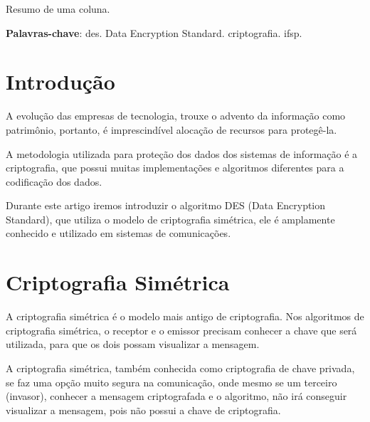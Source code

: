 \documentclass[
	article,			%
	12pt,				%
	oneside,			%
	a4paper,			%
	english,			%
	brazil,				%
	sumario=tradicional
	]{abntex2}
\begin{document}

\frenchspacing

\maketitle

\begin{resumoumacoluna}
 Resumo de uma coluna.

 \vspace{\onelineskip}

 \noindent
 \textbf{Palavras-chave}: des. Data Encryption Standard. criptografia. ifsp.
\end{resumoumacoluna}

\textual

\section*{Introdução}
\nocite{sistema-des}
\nocite{criptografia-simetrica-assimetrica-cifragem}
\nocite{estudo-descritivo-criptografia}

A evolução das empresas de tecnologia, trouxe o advento da informação como patrimônio, portanto, é imprescindível alocação de recursos para protegê-la.

A metodologia utilizada para proteção dos dados dos sistemas de informação é a criptografia, que possui muitas implementações e algoritmos diferentes para a codificação dos dados.

Durante este artigo iremos introduzir o algoritmo DES (Data Encryption Standard), que utiliza o modelo de criptografia simétrica, ele é amplamente conhecido e utilizado em sistemas de comunicações.

\section{Criptografia Simétrica}

A criptografia simétrica é o modelo mais antigo de criptografia. Nos algoritmos de criptografia simétrica, o receptor e o emissor precisam conhecer a chave que será utilizada, para que os dois possam visualizar a mensagem.

A criptografia simétrica, também conhecida como criptografia de chave privada, se faz uma opção muito segura na comunicação, onde mesmo se um terceiro (invasor), conhecer a mensagem criptografada e o algoritmo, não irá conseguir visualizar a mensagem, pois não possui a chave de criptografia.
\end{document}
